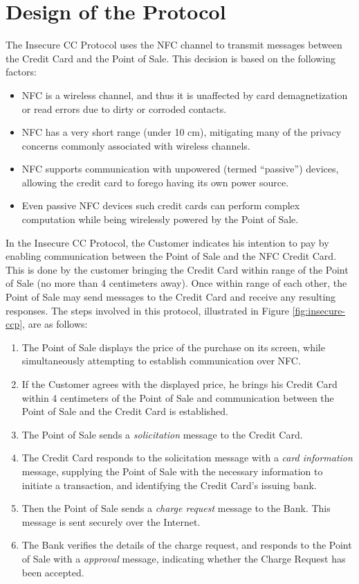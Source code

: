 \section{Design of the Protocol}
\label{sec:insecure-design}

The Insecure CC Protocol uses the NFC channel to transmit messages between the Credit Card and the Point of Sale.
This decision is based on the following factors:
\begin{itemize}
\item NFC is a wireless channel, and thus it is unaffected by card demagnetization or read errors due to dirty or corroded contacts.
\item NFC has a very short range (under 10 cm), mitigating many of the privacy concerns commonly associated with wireless channels.
\item NFC supports communication with unpowered (termed ``passive'') devices, allowing the credit card to forego having its own power source.
\item Even passive NFC devices such credit cards can perform complex computation while being wirelessly powered by the Point of Sale.
\end{itemize}

In the Insecure CC Protocol, the Customer indicates his intention to pay by enabling communication between the Point of Sale and the NFC Credit Card.
This is done by the customer bringing the Credit Card within range of the Point of Sale (no more than 4 centimeters away).
Once within range of each other, the Point of Sale may send messages to the Credit Card and receive any resulting responses.
The steps involved in this protocol, illustrated in Figure \ref{fig:insecure-ccp}, are as follows:

\begin{enumerate}
\item The Point of Sale displays the price of the purchase on its screen, while simultaneously attempting to establish communication over NFC.
\item If the Customer agrees with the displayed price, he brings his Credit Card within 4 centimeters of the Point of Sale and communication between the Point of Sale and the Credit Card is established.
\item The Point of Sale sends a \emph{solicitation} message to the Credit Card.
\item The Credit Card responds to the solicitation message with a \emph{card information} message, supplying the Point of Sale with the necessary information to initiate a transaction,
	and identifying the Credit Card's issuing bank.
\item Then the Point of Sale sends a \emph{charge request} message to the Bank. This message is sent securely over the Internet.
\item The Bank verifies the details of the charge request, and responds to the Point of Sale with a \emph{approval} message, indicating whether the Charge Request has been accepted.
\end{enumerate}


